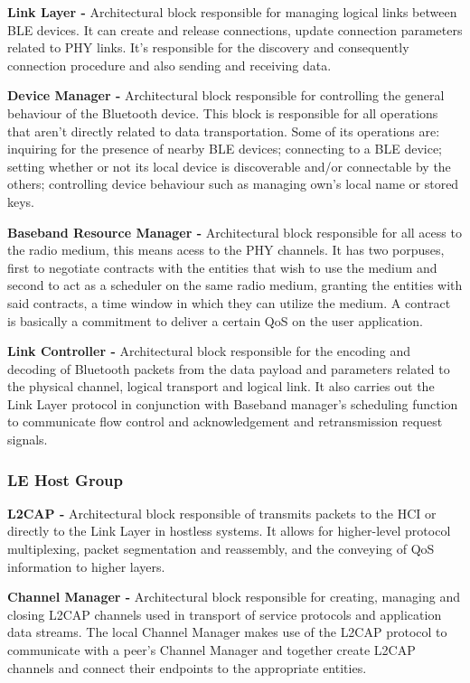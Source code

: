\textbf{Link Layer -} Architectural block responsible for managing logical links between \ac{BLE} devices. It can create and release connections, update connection parameters related to \ac{PHY} links. It's responsible for the discovery and consequently connection procedure and also sending and receiving data.


\textbf{Device Manager -} Architectural block responsible for controlling the general behaviour of the Bluetooth device. This block is responsible for all operations that aren't directly related to data transportation. Some of its operations are: inquiring for the presence of nearby  \ac{BLE} devices; connecting to a \ac{BLE} device; setting whether or not its local device is discoverable and/or connectable by the others; controlling device behaviour such as managing own's local name or stored keys. 


\textbf{Baseband Resource Manager -} Architectural block responsible for all acess to the radio medium, this means acess to the \ac{PHY} channels. It has two porpuses, first to negotiate contracts with the entities that wish to use the medium and second to act as a scheduler on the same radio medium, granting the entities with said contracts, a time window in which they can utilize the medium. A contract is basically a commitment to deliver a certain \ac{QoS} on the user application.


\textbf{Link Controller -} Architectural block responsible for the encoding and decoding of Bluetooth packets from the data payload and parameters related to the physical channel, logical transport and logical link. It also carries out the Link Layer protocol in conjunction with Baseband manager's scheduling function to communicate flow control and acknowledgement and retransmission request signals.



\subsubsection{ \ac{LE} Host Group}
\label{subsec:LEHost}

\textbf{\ac{L2CAP} -} Architectural block responsible of transmits packets to the \ac{HCI} or directly to the Link Layer in hostless systems. It allows for higher-level protocol multiplexing, packet segmentation and reassembly, and the conveying of \ac{QoS} information to higher layers.

 
\textbf{Channel Manager -} Architectural block responsible for creating, managing and closing \ac{L2CAP} channels used in transport of service protocols and application data streams. The local Channel Manager makes use of the \ac{L2CAP} protocol to communicate with a peer's Channel Manager and together create \ac{L2CAP} channels and connect their endpoints to the appropriate entities.


